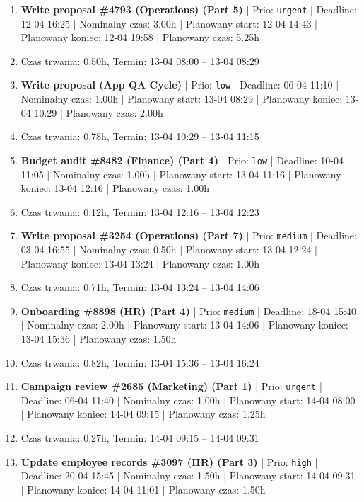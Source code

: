 {\begin{enumerate}
  \item [\textbf{14600}] \textbf{Write proposal \#4793 (Operations) (Part 5)} | Prio: \texttt{urgent} | Deadline: 12-04 16:25 | Nominalny czas: 3.00h | Planowany start: 12-04 14:43 | Planowany koniec: 12-04 19:58 | Planowany czas: 5.25h
  \item [\textbf{PRZERWA}] Czas trwania: 0.50h, Termin: 13-04 08:00 -- 13-04 08:29
  \item [\textbf{14695}] \textbf{Write proposal (App QA Cycle)} | Prio: \texttt{low} | Deadline: 06-04 11:10 | Nominalny czas: 1.00h | Planowany start: 13-04 08:29 | Planowany koniec: 13-04 10:29 | Planowany czas: 2.00h
  \item [\textbf{PRZERWA}] Czas trwania: 0.78h, Termin: 13-04 10:29 -- 13-04 11:15
  \item [\textbf{14694}] \textbf{Budget audit \#8482 (Finance) (Part 4)} | Prio: \texttt{low} | Deadline: 10-04 11:05 | Nominalny czas: 1.00h | Planowany start: 13-04 11:16 | Planowany koniec: 13-04 12:16 | Planowany czas: 1.00h
  \item [\textbf{PRZERWA}] Czas trwania: 0.12h, Termin: 13-04 12:16 -- 13-04 12:23
  \item [\textbf{14663}] \textbf{Write proposal \#3254 (Operations) (Part 7)} | Prio: \texttt{medium} | Deadline: 03-04 16:55 | Nominalny czas: 0.50h | Planowany start: 13-04 12:24 | Planowany koniec: 13-04 13:24 | Planowany czas: 1.00h
  \item [\textbf{PRZERWA}] Czas trwania: 0.71h, Termin: 13-04 13:24 -- 13-04 14:06
  \item [\textbf{14636}] \textbf{Onboarding \#8898 (HR) (Part 4)} | Prio: \texttt{medium} | Deadline: 18-04 15:40 | Nominalny czas: 2.00h | Planowany start: 13-04 14:06 | Planowany koniec: 13-04 15:36 | Planowany czas: 1.50h
  \item [\textbf{PRZERWA}] Czas trwania: 0.82h, Termin: 13-04 15:36 -- 13-04 16:24
  \item [\textbf{14607}] \textbf{Campaign review \#2685 (Marketing) (Part 1)} | Prio: \texttt{urgent} | Deadline: 06-04 11:40 | Nominalny czas: 1.00h | Planowany start: 14-04 08:00 | Planowany koniec: 14-04 09:15 | Planowany czas: 1.25h
  \item [\textbf{PRZERWA}] Czas trwania: 0.27h, Termin: 14-04 09:15 -- 14-04 09:31
  \item [\textbf{14621}] \textbf{Update employee records \#3097 (HR) (Part 3)} | Prio: \texttt{high} | Deadline: 20-04 15:45 | Nominalny czas: 1.50h | Planowany start: 14-04 09:31 | Planowany koniec: 14-04 11:01 | Planowany czas: 1.50h

\end{enumerate}}
